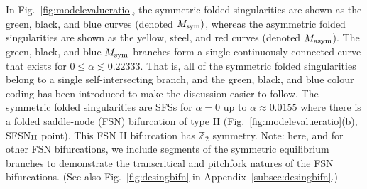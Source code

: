 \documentclass[10pt,onecolumn]{article}
\theoremstyle{plain}
\begin{document}
In Fig.~\ref{fig:modelevalueratio}, the symmetric folded singularities are shown as the green, black, and blue curves (denoted $M_{\rm sym})$, whereas the asymmetric folded singularities are shown as the yellow, steel, and red curves (denoted $M_{\rm asym}$). 
The green, black, and blue $M_{\rm sym}$ branches form a single continuously connected curve that exists for $0 \leq \alpha \lesssim 0.22333$. 
That is, all of the symmetric folded singularities belong to a single self-intersecting branch, and the green, black, and blue colour coding has been introduced to make the discussion easier to follow. 
The symmetric folded singularities are SFSs for $\alpha=0$ up to $\alpha \approx 0.0155$ where there is a folded saddle-node (FSN) bifurcation of type II \cite{Krupa2010} (Fig.~\ref{fig:modelevalueratio}(b), SFSN$_{\rm II}$ point).  
This FSN II bifurcation has $\mathbb Z_2$ symmetry.  
Note: here, and for other FSN bifurcations, we include segments of the symmetric equilibrium branches to demonstrate the transcritical and pitchfork natures of the FSN bifurcations. (See also Fig.~\ref{fig:desingbifn} in Appendix~\ref{subsec:desingbifn}.)
\end{document}
